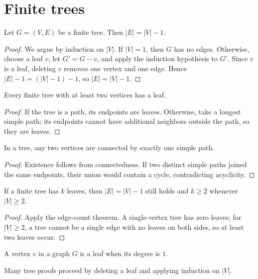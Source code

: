 
\section{Finite trees}

\begin{theorem}
Let $G=(V,E)$ be a finite tree. Then $|E| = |V| - 1$.
\end{theorem}
\begin{proof}
We argue by induction on $|V|$. If $|V|=1$, then $G$ has no edges. Otherwise, choose a leaf $v$, let $G' = G - v$, and apply the induction hypothesis to $G'$. Since $v$ is a leaf, deleting $v$ removes one vertex and one edge. Hence $|E|-1 = (|V|-1)-1$, so $|E| = |V|-1$.
\end{proof}

\begin{lemma}
Every finite tree with at least two vertices has a leaf.
\end{lemma}
\begin{proof}
If the tree is a path, its endpoints are leaves. Otherwise, take a longest simple path; its endpoints cannot have additional neighbors outside the path, so they are leaves.
\end{proof}

\begin{proposition}
In a tree, any two vertices are connected by exactly one simple path.
\end{proposition}
\begin{proof}
Existence follows from connectedness. If two distinct simple paths joined the same endpoints, their union would contain a cycle, contradicting acyclicity.
\end{proof}

\begin{corollary}
If a finite tree has $k$ leaves, then $|E| = |V| - 1$ still holds and $k \ge 2$ whenever $|V| \ge 2$.
\end{corollary}
\begin{proof}
Apply the edge-count theorem. A single-vertex tree has zero leaves; for $|V| \ge 2$, a tree cannot be a single edge with no leaves on both sides, so at least two leaves occur.
\end{proof}

\begin{definition}[Leaf]
A vertex $v$ in a graph $G$ is a leaf when its degree is $1$.
\end{definition}

\begin{remark}
Many tree proofs proceed by deleting a leaf and applying induction on $|V|$.
\end{remark}
